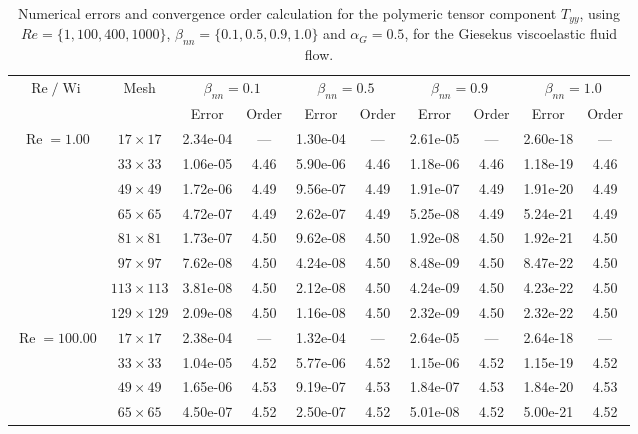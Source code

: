 \documentclass[preprint, 12pt]{elsarticle}
\begin{document}
\begin{center}
\begin{table}[H]
\caption{Numerical errors and convergence order calculation for the polymeric tensor component $T_{yy}$, using $Re=\{1,100,400,1000\}$, $\beta_{nn}=\{0.1,0.5,0.9,1.0\}$ and \mbox{$\alpha_G = 0.5$}, for the Giesekus viscoelastic fluid flow.\label{tab_GiesekusTyyalphaG05Wi5_10}}
\tiny{
    \begin{tabular*}{\textwidth}{@{\extracolsep\fill}cccccccccc@{}}
    \hline
    \multirow{2}{*}{$\operatorname{Re}/\operatorname{Wi}$} & \multirow{2}{*}{Mesh} & \multicolumn{2}{c}{$\beta_{nn}=0.1$}  & \multicolumn{2}{c}{$\beta_{nn}=0.5$}  & \multicolumn{2}{c}{$\beta_{nn}=0.9$}  & \multicolumn{2}{c}{$\beta_{nn}=1.0$}\\ %
     & & Error & Order & Error & Order & Error & Order & Error & Order \\
    \hline
    \multirow{7}{*}{$\operatorname{Re}=1.00$} & $17\times 17$ & 2.34e-04 & --- & 1.30e-04 & --- & 2.61e-05 & --- & 2.60e-18 & --- \\
    & $33\times 33$ & 1.06e-05 & 4.46 & 5.90e-06 & 4.46 & 1.18e-06 & 4.46 & 1.18e-19 & 4.46 \\
    & $49\times 49$ & 1.72e-06 & 4.49 & 9.56e-07 & 4.49 & 1.91e-07 & 4.49 & 1.91e-20 & 4.49 \\
    \multirow{3}{*}{$\operatorname{Wi}=5$} & $65\times 65$ & 4.72e-07 & 4.49 & 2.62e-07 & 4.49 & 5.25e-08 & 4.49 & 5.24e-21 & 4.49 \\
    & $81\times 81$ & 1.73e-07 & 4.50 & 9.62e-08 & 4.50 & 1.92e-08 & 4.50 & 1.92e-21 & 4.50 \\
    & $97\times 97$ & 7.62e-08 & 4.50 & 4.24e-08 & 4.50 & 8.48e-09 & 4.50 & 8.47e-22 & 4.50 \\
    & $113\times 113$ & 3.81e-08 & 4.50 & 2.12e-08 & 4.50 & 4.24e-09 & 4.50 & 4.23e-22 & 4.50 \\
    & $129\times 129$ & 2.09e-08 & 4.50 & 1.16e-08 & 4.50 & 2.32e-09 & 4.50 & 2.32e-22 & 4.50 \\
    \hline
    \multirow{7}{*}{$\operatorname{Re}=100.00$} & $17\times 17$ & 2.38e-04 & --- & 1.32e-04 & --- & 2.64e-05 & --- & 2.64e-18 & --- \\
    & $33\times 33$ & 1.04e-05 & 4.52 & 5.77e-06 & 4.52 & 1.15e-06 & 4.52 & 1.15e-19 & 4.52 \\
    & $49\times 49$ & 1.65e-06 & 4.53 & 9.19e-07 & 4.53 & 1.84e-07 & 4.53 & 1.84e-20 & 4.53 \\
    \multirow{3}{*}{$\operatorname{Wi}=5$} & $65\times 65$ & 4.50e-07 & 4.52 & 2.50e-07 & 4.52 & 5.01e-08 & 4.52 & 5.00e-21 & 4.52 \\

\end{tabular*}}
\end{table}
\end{center}
\end{document}

